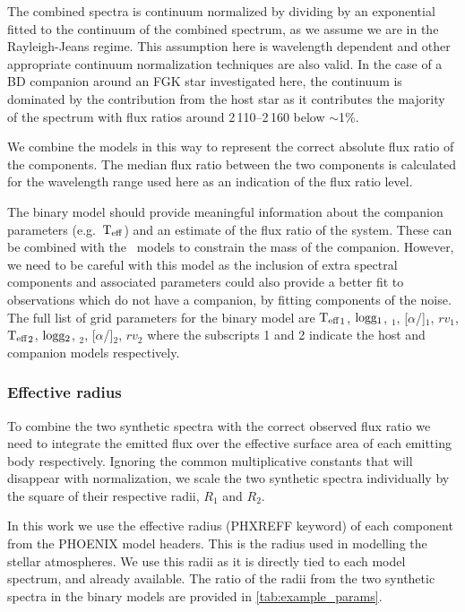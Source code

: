 The combined spectra is continuum normalized by dividing by an exponential fitted to the continuum of the combined spectrum, as we assume we are in the Rayleigh-Jeans regime.
This assumption here is wavelength dependent and other appropriate continuum normalization techniques are also valid.
In the case of a {BD} companion around an FGK star investigated here, the continuum is dominated by the contribution from the host star as it contributes the majority of the spectrum with flux ratios around 2\,110--2\,160\nm{} below \(\sim\)1\%.

We combine the models in this way to represent the correct absolute flux ratio of the components.
The median flux ratio between the two components is calculated for the wavelength range used here as an indication of the flux ratio level.

The binary model should provide meaningful information about the companion parameters (e.g.\ \(\textrm{T}_{\mathrm{eff}}{}\)) and an estimate of the flux ratio of the system.
These can be combined with the~\citet{baraffe_evolutionary_2003} models to constrain the mass of the companion.
However, we need to be careful with this model as the inclusion of extra spectral components and associated parameters could also provide a better fit to observations which do not have a companion, by fitting components of the noise.\\

{\red{} The full list of grid parameters for the binary model are \({\textrm{T}_{\mathrm{eff}}}_{1}\),  \(\textrm{logg}{}_1\), \feh{}\(_1\), [\(\alpha\)/]\(_1\), \({rv}_1\), \({\textrm{T}_{\mathrm{eff}}}_{2}\), \(\textrm{logg}{}_2\), \feh{}\(_2\), [\(\alpha\)/]\(_2\), \({rv}_2\) where the subscripts 1 and 2 indicate the host and companion models respectively.}






\subsubsection{Effective radius}
\label{subsection-radius}

To combine the two synthetic spectra with the correct observed flux ratio we need to integrate the emitted flux over the effective surface area of each emitting body respectively.
Ignoring the common multiplicative constants that will disappear with normalization, we scale the two synthetic spectra individually by the square of their respective radii, \(R_1\) and \(R_2\).

In this work we use the effective radius (PHXREFF keyword) of each component from the {PHOENIX} model headers.
This is the radius used in modelling the stellar atmospheres.
We use this radii as it is directly tied to each model spectrum, and already available.
The ratio of the radii from the two synthetic spectra in the binary models are provided in \cref{tab:example_params}.

